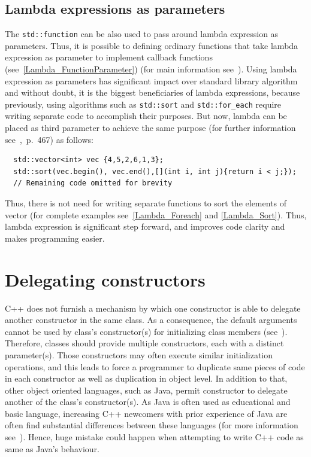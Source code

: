 \documentclass[11pt]{report}
\begin{document}
\subsection{Lambda expressions as parameters}
\label{subsection: Lambda Expressions as Parameters}
The \texttt{std::function} can be also used to pass around lambda expression as parameters. Thus, it is possible to defining ordinary functions that take lambda expression as parameter to implement callback functions (see~\ref{Lambda_FunctionParameter}) (for main information see~\cite{Allain:2011:FutureCpp}). Using lambda expression as parameters has significant impact over standard library algorithm and without doubt, it is the biggest beneficiaries of lambda expressions, because previously, using algorithms such as \texttt{std::sort} and \linebreak \texttt{std::for\_each} require writing separate code to accomplish their purposes. But now, lambda can be placed as third parameter to achieve the same purpose (for further information see~\cite{Gregorie:professionalcpp},~p.~467) as follows:
\begin{lstlisting}
  std::vector<int> vec {4,5,2,6,1,3};
  std::sort(vec.begin(), vec.end(),[](int i, int j){return i < j;});
  // Remaining code omitted for brevity
\end{lstlisting}
Thus, there is not need for writing separate functions to sort the elements of vector (for complete examples see~\ref{Lambda_Foreach} and \ref{Lambda_Sort}). Thus, lambda expression is significant step forward, and improves code clarity and makes programming easier.

\section{Delegating constructors}
\label{section: Delegating constructors}
C++ does not furnish a mechanism by which one constructor is able to delegate another constructor in the same class.  As a consequence, the default arguments cannot be used by class's constructor(s) for initializing class members (see~\cite{Stroustrup:2012:Cpp11}). Therefore, classes should provide multiple constructors, each with a distinct parameter(s). Those constructors may often execute similar initialization operations, and this leads to force a programmer to duplicate same pieces of code in each constructor as well as duplication in object level. In addition to that, other object oriented languages, such as Java, permit constructor to delegate another of the class's constructor(s). As Java is often used as educational and basic language, increasing C++ newcomers with prior experience of Java are often find substantial differences between these languages (for more information see~\cite{Stroustrup:2012:Cpp11}). Hence, huge mistake could happen when attempting to write C++ code as same as Java's behaviour.
\end{document}
